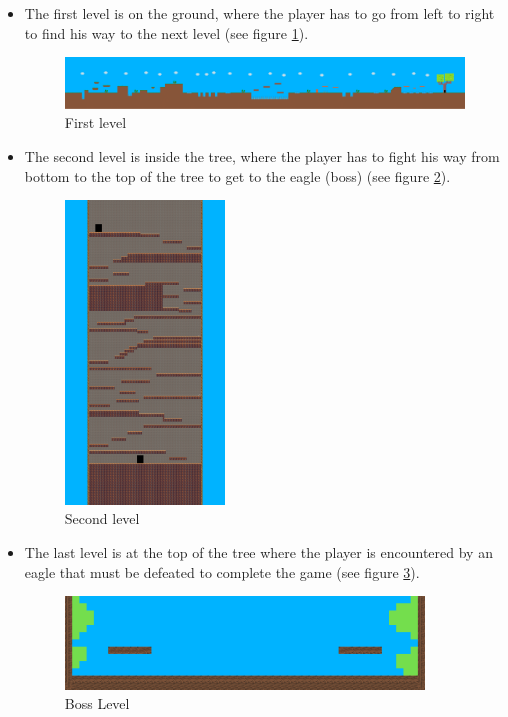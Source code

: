 \documentclass[12p]{article}
\begin{document}
\begin{itemize}
 \item The first level is on the ground, where the player has to go from left to right to find his way to the next level (see figure \ref{fig:FirstLevel}).
 
\begin{figure}[ht]
 \center
 \includegraphics[width=1\textwidth]{Documentation/level_1.png}
 \caption{First level}
 \label{fig:FirstLevel}
\end{figure}

 \item The second level is inside the tree, where the player has to fight his way from bottom to the top of the tree to get to the eagle (boss) (see figure \ref{fig:SecondLevel}).

\begin{figure}[ht]
 \center
 \includegraphics[width=0.4\textwidth]{Documentation/level_2.png}
  \caption{Second level}
 \label{fig:SecondLevel}
\end{figure}

 \item The last level is at the top of the tree where the player is encountered by an eagle that must be defeated to complete the game (see figure \ref{fig:BossLevel}).
 
 \begin{figure}[ht]
   \center
   \includegraphics[width=0.9\textwidth]{Documentation/boss_level.png}
   \caption{Boss Level}
   \label{fig:BossLevel}
  \end{figure}
\end{itemize}
\end{document}
